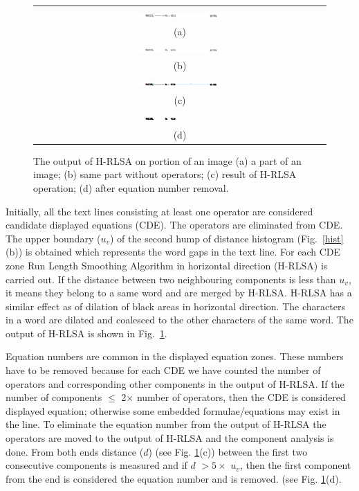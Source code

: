 \documentclass[conference]{IEEEtran}
\begin{document}
\begin{figure}[h]
\center\footnotesize 
\begin{tabular}{|c|}
\hline
 \includegraphics[width=0.3\textwidth]{equation.png} \\ (a)\\  
 \includegraphics[width=0.3\textwidth]{equationOperands.png} \\ (b)\\  
\includegraphics[width=0.3\textwidth]{equationNumber.png} \\ (c) \\ 
\includegraphics[width=0.3\textwidth]{hrlsaRemoval.png} \\ (d) \\ 
\hline 
\end{tabular}
\caption{The output of H-RLSA on portion of an image (a) a part of an image; (b) same part without operators; (c) result of H-RLSA operation; (d) after equation number removal.}
\label{h-rlsa} 
\end{figure} 
Initially, all the text lines consisting at least one operator
are considered candidate displayed equations (CDE). The
operators are eliminated from CDE. The upper boundary ($u_v$) of
the second hump of distance histogram (Fig.~\ref{hist}(b)) is obtained which
represents the word gaps in the text line. For each CDE zone Run
Length Smoothing Algorithm in horizontal direction (H-RLSA) is
carried out. If the distance between two neighbouring components
is less than $u_v$, it means they belong to a same word and are
merged by H-RLSA. H-RLSA has a similar effect as of dilation of
black areas in horizontal direction. The characters in a word
are dilated and coalesced to the other characters of the same
word. The output of H-RLSA is shown in Fig.~\ref{h-rlsa}.

Equation numbers are common in the displayed equation zones.
These numbers have to be removed because for each CDE we have
counted the number of operators and corresponding other
components in the output of H-RLSA. If the number of components
$\le$ 2$\times$ number of operators, then the CDE is considered
displayed equation; otherwise some embedded formulae/equations
may exist in the line. To eliminate the equation number from the
output of H-RLSA the operators are moved to the output of H-RLSA
and the component analysis is done. From both ends distance
($d$) (see Fig. \ref{h-rlsa}(c))
 between the first two consecutive
components is measured and if $d$ $> 5\times$ $u_v$, then the
first component from the end is considered the equation number
and is removed. (see Fig. \ref{h-rlsa}(d).
\end{document}
